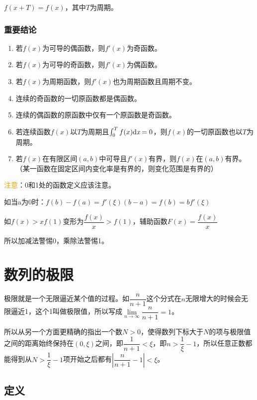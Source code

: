 \documentclass[UTF8, 12pt]{ctexart}
\begin{document}
        $f(x+T)=f(x)$，其中$T$为周期。 \medskip

        \subsubsection{重要结论}

        \begin{enumerate}
            \item 若$f(x)$为可导的偶函数，则$f'(x)$为奇函数。
            \item 若$f(x)$为可导的奇函数，则$f'(x)$为偶函数。
            \item 若$f(x)$为周期函数，则$f'(x)$也为周期函数且周期不变。
            \item 连续的奇函数的一切原函数都是偶函数。
            \item 连续的偶函数的原函数中仅有一个原函数是奇函数。
            \item 若连续函数$f(x)$以$T$为周期且$\int_{0}^{T}f(x)\rm{d}\textit{x}=0$，则$f(x)$的一切原函数也以$T$为周期。
            \item 若$f(x)$在有限区间$(a,b)$中可导且$f'(x)$有界，则$f(x)$在$(a,b)$有界。（某一函数在固定区间内变化率是有界的，则变化范围是有界的）
        \end{enumerate}

        \textcolor{orange}{注意}：0和1处的函数定义应该注意。

        如当a为0时：$f(b)-f(a)=f'(\xi )(b-a)=f(b)=bf'(\xi)$

        如$f(x)>xf(1)$变形为$\dfrac{f(x)}{x}>f(1)$，辅助函数$F(x)=\dfrac{f(x)}{x}$

        所以加减法警惕0，乘除法警惕1。

        \section{数列的极限}

        极限就是一个无限逼近某个值的过程。如$\dfrac{n}{n+1}$这个分式在$n$无限增大的时候会无限逼近1，这个1叫做极限值，所以写成$\lim\limits_{n\to\infty}\dfrac{n}{n+1}=1$。

        所以从另一个方面更精确的指出一个数$N>0$，使得数列下标大于$N$的项与极限值之间的距离始终保持在$(0,\xi)$之间，即$\dfrac{1}{n+1}<\xi$，即$n>\dfrac{1}{\xi}-1$，所以任意正数都能得到从$N>\dfrac{1}{\xi}-1$项开始之后都有$\left\vert\dfrac{n}{n+1}-1\right\vert<\xi$。

        \subsection{定义}
\end{document}
